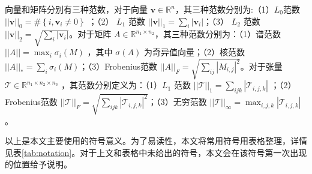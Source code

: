 向量和矩阵分别有三种范数，对于向量 $ \mathbf{v}\in \mathbb{R}^n $，其三种范数分别为:（1）$ L_0 $范数 $ \left|\left| \mathbf{v} \right|\right|_0= \# \left\{i,\mathbf{v}_i \ne 0 \right\} $ ；（2） $ L_1 $ 范数 $ \left|\left| \mathbf{v} \right|\right|_1= \sum_i \left| \mathbf{v}_i \right|$；（3） $ L_2 $ 范数 $ \left|\left| \mathbf{v} \right|\right|_2= \sqrt{\sum_i \left| \mathbf{v}_i \right|} $。对于矩阵 $ A\in\mathbb{R}^{n_1\times n_2} $，其三种范数分别为：（1）谱范数 $ \left|\left| A \right|\right|=\max_i\sigma_i(M)$ ，其中 $ \sigma(A) $ 为奇异值向量；（2）核范数 $ \left|\left| A \right|\right|_*= \sum_i \sigma_i(M) $；（3）Frobenius范数 $ \left|\left| A \right|\right|_F = \sqrt{\sum_{ij}\left|M_{i,j}\right|^2} $。对于张量 $ \mathcal{T} \in \mathbb{R}^{n_1 \times n_2 \times n_3 } $ ，其范数分别定义为：（1）$ L_1 $ 范数 $ \left|\left| \mathcal{T} \right|\right|_1= \sum_{ijk} \left| \mathcal{T}_{i,j,k} \right|$ ；（2）Frobenius范数 $ \left|\left| \mathcal{T} \right|\right|_F = \sqrt{\sum_{ijk}\left|\mathcal{T}_{i,j,k}\right|^2} $；（3）无穷范数 $ \left|\left| \mathcal{T} \right|\right|_{\infty} = \max_{i,j,k}\left|\mathcal{T}_{i,j,k}\right| $。

以上是本文主要使用的符号意义。为了易读性，本文将常用符号用表格整理，详情见表\ref{tab:notation}。对于上文和表格中未给出的符号，本文会在该符号第一次出现的位置给予说明。

